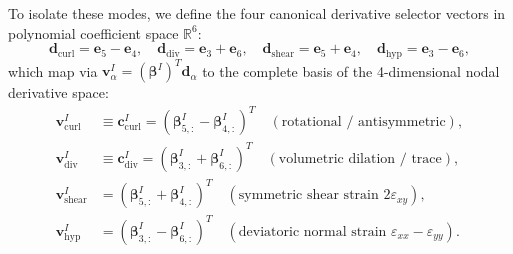 \documentclass[preprint,12pt]{elsarticle}
\begin{document}
To isolate these modes, we define the four canonical derivative selector vectors in polynomial coefficient space $\mathbb{R}^6$:
\begin{equation}
    \mathbf{d}_{\mathrm{curl}} = \mathbf{e}_5 - \mathbf{e}_4, \quad
    \mathbf{d}_{\mathrm{div}} = \mathbf{e}_3 + \mathbf{e}_6, \quad
    \mathbf{d}_{\mathrm{shear}} = \mathbf{e}_5 + \mathbf{e}_4, \quad
    \mathbf{d}_{\mathrm{hyp}} = \mathbf{e}_3 - \mathbf{e}_6,
    \label{eq:canonical_d_vectors}
\end{equation}
which map via $\mathbf{v}_\alpha^I = (\boldsymbol{\beta}^I)^T \mathbf{d}_\alpha$ to the complete basis of the 4-dimensional nodal derivative space:
\begin{align}
    \mathbf{v}_{\mathrm{curl}}^I  & \equiv \mathbf{c}_{\mathrm{curl}}^I = (\boldsymbol{\beta}_{5, :}^I - \boldsymbol{\beta}_{4, :}^I)^T \quad (\text{rotational / antisymmetric}), \label{eq:v_curl_def}                   \\
    \mathbf{v}_{\mathrm{div}}^I   & \equiv \mathbf{c}_{\mathrm{div}}^I = (\boldsymbol{\beta}_{3, :}^I + \boldsymbol{\beta}_{6, :}^I)^T \quad (\text{volumetric dilation / trace}), \label{eq:v_div_def}                     \\
    \mathbf{v}_{\mathrm{shear}}^I & = (\boldsymbol{\beta}_{5, :}^I + \boldsymbol{\beta}_{4, :}^I)^T \quad (\text{symmetric shear strain } 2\varepsilon_{xy}), \label{eq:v_shear_def}                   \\
    \mathbf{v}_{\mathrm{hyp}}^I   & = (\boldsymbol{\beta}_{3, :}^I - \boldsymbol{\beta}_{6, :}^I)^T \quad (\text{deviatoric normal strain } \varepsilon_{xx} - \varepsilon_{yy}). \label{eq:v_hyp_def}
\end{align}
\end{document}
